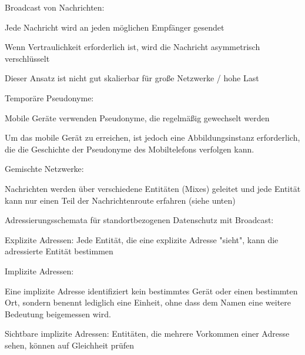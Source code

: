 \documentclass[a4paper]{article}
\begin{document}
\begin{multicols}{3}
\begin{itemize*}
\begin{itemize*}
\begin{itemize*}
                        \item Broadcast von Nachrichten:
                        \begin{itemize*} \item Jede Nachricht wird an jeden möglichen Empfänger gesendet \item Wenn Vertraulichkeit erforderlich ist, wird die Nachricht asymmetrisch verschlüsselt \item Dieser Ansatz ist nicht gut skalierbar für große Netzwerke / hohe Last \end{itemize*}
                        \item Temporäre Pseudonyme:
                        \begin{itemize*} \item Mobile Geräte verwenden Pseudonyme, die regelmäßig gewechselt werden \item Um das mobile Gerät zu erreichen, ist jedoch eine Abbildungsinstanz erforderlich, die die Geschichte der Pseudonyme des Mobiltelefons verfolgen kann. \end{itemize*}
                        \item Gemischte Netzwerke:
                        \begin{itemize*} \item Nachrichten werden über verschiedene Entitäten (Mixes) geleitet und jede Entität kann nur einen Teil der Nachrichtenroute erfahren (siehe unten) \end{itemize*}
                  \end{itemize*}
                  \item       Adressierungsschemata für standortbezogenen Datenschutz mit Broadcast:
                  \begin{itemize*}
                        \item Explizite Adressen: Jede Entität, die eine explizite Adresse "sieht", kann die adressierte Entität bestimmen
                  \end{itemize*}
                  \item Implizite Adressen:
                  \begin{itemize*}
                        \item Eine implizite Adresse identifiziert kein bestimmtes Gerät oder einen bestimmten Ort, sondern benennt lediglich eine Einheit, ohne dass dem Namen eine weitere Bedeutung beigemessen wird.
                        \item Sichtbare implizite Adressen: Entitäten, die mehrere Vorkommen einer Adresse sehen, können auf Gleichheit prüfen

\end{itemize*}
\end{itemize*}
\end{itemize*}
\end{multicols}
\end{document}
